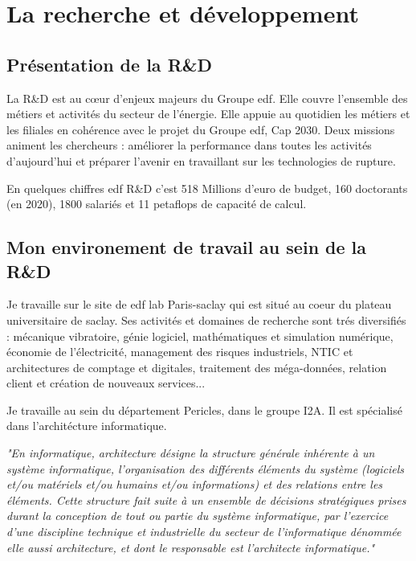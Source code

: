 \justify
\section{La recherche et développement}

\subsection{Présentation de la R\&D}

La R\&D est au cœur d’enjeux majeurs du Groupe \acrshort{edf}. Elle couvre l’ensemble des métiers et activités du secteur de l’énergie. Elle appuie au quotidien les métiers et les filiales en cohérence avec le projet du Groupe \acrshort{edf}, Cap 2030. Deux missions animent les chercheurs : améliorer la performance dans toutes les activités d’aujourd’hui et préparer l’avenir en travaillant sur les technologies de rupture.

En quelques chiffres \acrshort{edf} R\&D c'est 518 Millions d'euro de budget, 160 doctorants (en 2020), 1800 salariés et 11 petaflops de capacité de calcul.

\subsection{Mon environement de travail au sein de la R\&D}
Je travaille sur le site de \acrshort{edf} lab Paris-saclay qui est situé au coeur du plateau universitaire de saclay. Ses activités et domaines de recherche sont trés diversifiés : mécanique vibratoire, génie logiciel, mathématiques et simulation numérique, économie de l'électricité, management des risques industriels, NTIC et architectures de comptage et digitales, traitement des méga-données, relation client et création de nouveaux services...

Je travaille au sein du département Pericles, dans le groupe I2A. Il est spécialisé dans l'architécture informatique.

\textit{
    "En informatique, architecture désigne la structure générale inhérente à un système informatique, l'organisation des différents éléments du système (logiciels et/ou matériels et/ou humains et/ou informations) et des relations entre les éléments. Cette structure fait suite à un ensemble de décisions stratégiques prises durant la conception de tout ou partie du système informatique, par l'exercice d'une discipline technique et industrielle du secteur de l'informatique dénommée elle aussi architecture, et dont le responsable est l'architecte informatique."
}   \cite{wikipedia_archi_info}

